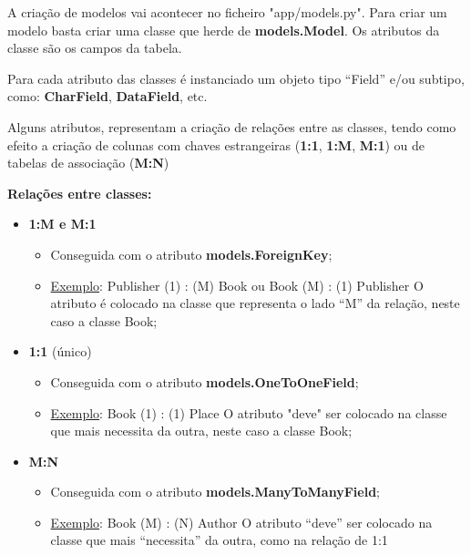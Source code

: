 \documentclass{article}
\begin{document}
\begin{flushleft}
  A criação de modelos vai acontecer no ficheiro "app/models.py".
  Para criar um modelo basta criar uma classe que herde de \textbf{models.Model}.
  Os atributos da classe são os campos da tabela.

  \vspace{2mm}

  Para cada atributo das classes é instanciado um
  objeto tipo “Field” e/ou subtipo, como: \textbf{CharField},
  \textbf{DataField}, etc.

  Alguns atributos, representam a criação de relações
  entre as classes, tendo como efeito a criação de
  colunas com chaves estrangeiras (\textbf{1:1}, \textbf{1:M}, \textbf{M:1}) ou
  de tabelas de associação (\textbf{M:N})

  \vspace{3mm}

  \textbf{Relações entre classes:}

  \begin{itemize}
    \item \textbf{1:M e M:1}
    \begin{itemize}
      \item Conseguida com o atributo \textbf{models.ForeignKey};
      \item \uline{Exemplo}: Publisher (1) : (M) Book ou Book (M) : (1) Publisher
      O atributo é colocado na classe que representa o lado “M” da relação, neste caso a classe Book;
    \end{itemize}

    \item \textbf{1:1} (único)
    \begin{itemize}
      \item Conseguida com o atributo \textbf{models.OneToOneField};
      \item \uline{Exemplo}: Book (1) : (1) Place
      O atributo "deve" ser colocado na classe que mais necessita da outra, neste caso a classe Book;
    \end{itemize}

    \item \textbf{M:N}
    \begin{itemize}
      \item Conseguida com o atributo \textbf{models.ManyToManyField};
      \item \uline{Exemplo}: Book (M) : (N) Author
      O atributo “deve” ser colocado na classe que mais “necessita” da
outra, como na relação de 1:1 
    \end{itemize}
  \end{itemize}


\end{flushleft}
\end{document}

